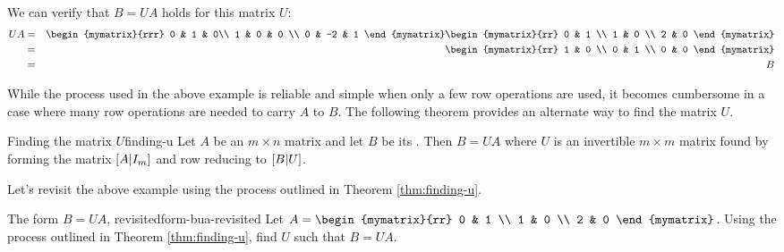 \begin{solution}
We can verify that $B = UA$ holds for this matrix $U$:
\begin{eqnarray*}
UA &=& \begin{mymatrix}{rrr}
0 & 1 & 0\\
1 & 0 & 0 \\
0 & -2  & 1 
\end{mymatrix}
\begin{mymatrix}{rr}
0 & 1 \\
1 & 0 \\
2 & 0
\end{mymatrix} \\
&=& \begin{mymatrix}{rr}
1 & 0 \\
0 & 1 \\
0 & 0 
\end{mymatrix} \\
&=& B 
\end{eqnarray*} 
\end{solution}

While the process used in the above example is reliable and simple when only a few row operations are used, it becomes cumbersome in a case where many row operations are needed to carry $A$ to $B$. The following theorem provides an alternate way to find the matrix $U$. 

\begin{theorem}{Finding the matrix $U$}{finding-u}
Let $A$ be an $m \times n$ matrix and let $B$ be its {\rref}. Then $B = UA$ where $U$ is an invertible $m \times m$ matrix found by forming the matrix $ \left[A | I_m \right]$ and row reducing to $\left[B | U \right]$. 
\end{theorem}

Let's revisit the above example using the process outlined in Theorem \ref{thm:finding-u}.

\begin{example}{The form $B=UA$, revisited}{form-bua-revisited}
Let $A = \begin{mymatrix}{rr} 
0 & 1 \\
1 & 0 \\
2 & 0 
\end{mymatrix}$. Using the process outlined in Theorem \ref{thm:finding-u}, find $U$ such that $B=UA$. 
\end{example}

